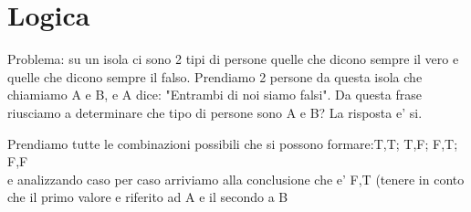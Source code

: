\documentclass{article}
\begin{document}
    \section{Logica}
    \begin{flushleft}
       Problema: su un isola ci sono 2 tipi di persone quelle che dicono sempre il vero e quelle che dicono sempre il falso.
       Prendiamo 2 persone da questa isola che chiamiamo A e B, e A dice: "Entrambi di noi siamo falsi". Da questa frase riusciamo a determinare
       che tipo di persone sono A e B? La risposta e' si.
    \end{flushleft}
    \begin{flushleft}
     Prendiamo tutte le combinazioni possibili che si possono formare:T,T; T,F; F,T; F,F\\
     e analizzando caso per caso arriviamo alla conclusione che e' F,T (tenere in conto che il primo valore e riferito ad A e il secondo a B%
    \end{flushleft}
\end{document}
